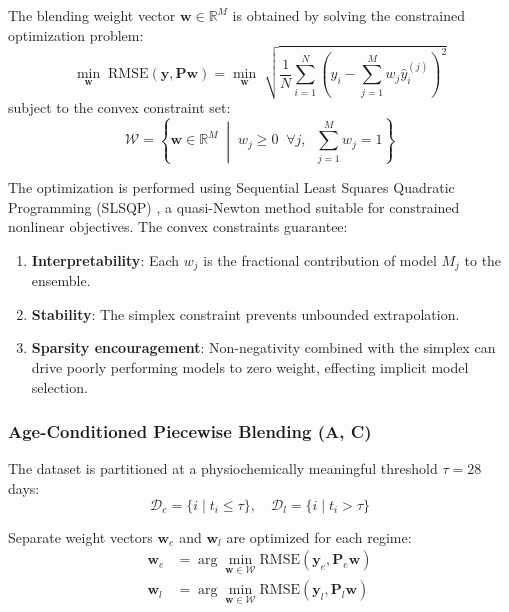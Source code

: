 \documentclass[journal]{IEEEtran}
\begin{document}
The blending weight vector $\mathbf{w} \in \mathbb{R}^M$ is obtained by solving the constrained optimization problem:
\begin{equation}
\min_{\mathbf{w}} \; \text{RMSE}(\mathbf{y}, \mathbf{P}\mathbf{w}) = \min_{\mathbf{w}} \; \sqrt{\frac{1}{N}\sum_{i=1}^{N}\left(y_i - \sum_{j=1}^{M} w_j \hat{y}_i^{(j)}\right)^2}
\end{equation}
subject to the convex constraint set:
\begin{equation}
\mathcal{W} = \left\{\mathbf{w} \in \mathbb{R}^M \; \middle| \; w_j \geq 0 \;\; \forall j, \;\; \sum_{j=1}^{M} w_j = 1\right\}
\end{equation}

The optimization is performed using Sequential Least Squares Quadratic Programming (SLSQP) \cite{kraft1988software}, a quasi-Newton method suitable for constrained nonlinear objectives. The convex constraints guarantee:
\begin{enumerate}
\item \textbf{Interpretability}: Each $w_j$ is the fractional contribution of model $M_j$ to the ensemble.
\item \textbf{Stability}: The simplex constraint prevents unbounded extrapolation.
\item \textbf{Sparsity encouragement}: Non-negativity combined with the simplex can drive poorly performing models to zero weight, effecting implicit model selection.
\end{enumerate}

\subsubsection{Age-Conditioned Piecewise Blending (A, C)}

The dataset is partitioned at a physiochemically meaningful threshold $\tau = 28$ days:
\begin{equation}
\mathcal{D}_e = \{i \mid t_i \leq \tau\}, \quad \mathcal{D}_l = \{i \mid t_i > \tau\}
\end{equation}

Separate weight vectors $\mathbf{w}_e$ and $\mathbf{w}_l$ are optimized for each regime:
\begin{align}
\mathbf{w}_e &= \arg\min_{\mathbf{w} \in \mathcal{W}} \text{RMSE}(\mathbf{y}_e, \mathbf{P}_e\mathbf{w}) \\
\mathbf{w}_l &= \arg\min_{\mathbf{w} \in \mathcal{W}} \text{RMSE}(\mathbf{y}_l, \mathbf{P}_l\mathbf{w})
\end{align}
\end{document}
